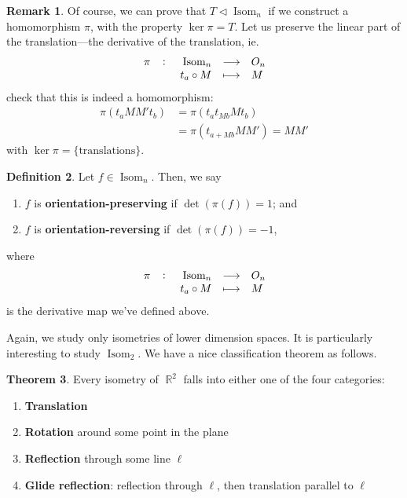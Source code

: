 \documentclass[11pt]{amsart} %
\theoremstyle{definition}
\newtheorem{definition}{Definition}[section]
\newtheorem{theorem}[definition]{Theorem}
\theoremstyle{definition}
\newtheorem{remark}[definition]{Remark}
\DeclareMathOperator{\R}{\mathbb{R}}
\DeclareMathOperator{\isom}{Isom}
\numberwithin{equation}{section}
\begin{document}
\begin{remark}
	Of course, we can prove that $T \lhd \isom_n$ if we construct a homomorphism $\pi$, with the property $\ker \pi = T$. Let us preserve the linear part of the translation---the derivative of the translation, ie.
	$$\fullfunction{\pi}{\isom_n}{O_n}{t_a \circ M}{M}$$
	check that this is indeed a homomorphism:
	\begin{align*}
		\pi (t_a M M' t_b) &= \pi ( t_a t_{Mb} M t_b ) \\
		&= \pi ( t_{a+Mb} M M' ) = M M'
	\end{align*}
	with $\ker \pi = \{\text{translations} \}$.
\end{remark}

\begin{definition}
	Let $f \in \isom_n$. Then, we say
	\begin{enumerate}%
		\item $f$ is \textbf{orientation-preserving} if $\det (\pi (f) ) = 1$; and
		\item $f$ is \textbf{orientation-reversing} if $\det (\pi (f) ) = -1$,	
	\end{enumerate}	
	where
	$$	\fullfunction{\pi}{\isom_n}{O_n}{t_a \circ M}{M}$$
	is the derivative map we've defined above.
\end{definition}

Again, we study only isometries of lower dimension spaces. It is particularly interesting to study $\isom_2$. We have a nice classification theorem as follows.

\begin{theorem}
	\label{isom2categories}
	Every isometry of $\R^2$ falls into either one of the four categories:
	\begin{enumerate}%
		\item \textbf{Translation}
		\item \textbf{Rotation} around some point in the plane
		\item \textbf{Reflection} through some line $\ell$
		\item \textbf{Glide reflection}: reflection through $\ell$, then translation parallel to $\ell$
	\end{enumerate}
\end{theorem}
\end{document}

